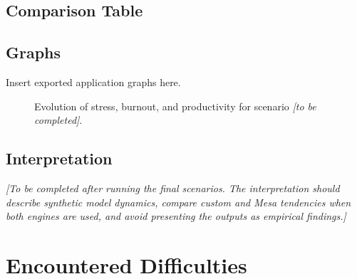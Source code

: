 \documentclass[12pt,a4paper]{article}
\begin{document}
\subsection{Comparison Table}

\begin{table}[ht]
    \centering
    \caption{Synthetic comparative results obtained from AWDS simulations.}
\end{table}

\subsection{Graphs}

Insert exported application graphs here.

\begin{figure}[ht]
    \centering
    \caption{Evolution of stress, burnout, and productivity for scenario \textit{[to be completed]}.}
\end{figure}

\subsection{Interpretation}

\textit{[To be completed after running the final scenarios. The interpretation should describe synthetic model dynamics, compare custom and Mesa tendencies when both engines are used, and avoid presenting the outputs as empirical findings.]}

\section{Encountered Difficulties}
\end{document}
